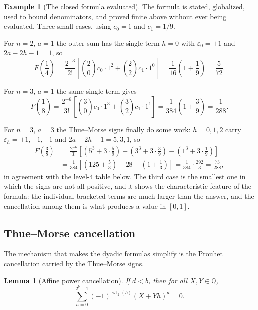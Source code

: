 \documentclass[11pt,oneside]{article}
\newtheorem{lemma}[theorem]{Lemma}
\theoremstyle{definition}
\newtheorem{example}[theorem]{Example}
\theoremstyle{remark}
\newcommand{\Q}{\mathbb Q}
\newcommand{\wt}{\operatorname{wt}_2}
\begin{document}
\begin{example}[The closed formula evaluated]
\label{ex:dy-closed-worked}
The formula is stated, globalized, used to bound denominators, and proved finite above
without ever being evaluated.  Three small cases, using $c_0=1$ and $c_1=1/9$.

For $n=2$, $a=1$ the outer sum has the single term $h=0$ with $\varepsilon_0=+1$ and
$2a-2h-1=1$, so
\begin{equation*}
 F\!\left(\frac14\right)=\frac{2^{-3}}{2!}
 \left[\binom20c_0\cdot1^{2}+\binom22c_1\cdot1^{0}\right]
 =\frac1{16}\left(1+\frac19\right)=\frac5{72}.
\end{equation*}

For $n=3$, $a=1$ the same single term gives
\begin{equation*}
 F\!\left(\frac18\right)=\frac{2^{-6}}{3!}
 \left[\binom30c_0\cdot1^{3}+\binom32c_1\cdot1^{1}\right]
 =\frac1{384}\left(1+\frac39\right)=\frac1{288}.
\end{equation*}

For $n=3$, $a=3$ the Thue--Morse signs finally do some work: $h=0,1,2$ carry
$\varepsilon_h=+1,-1,-1$ and $2a-2h-1=5,3,1$, so
\begin{align*}
 F\!\left(\frac38\right)
 &=\frac{2^{-6}}{3!}\left[\left(5^{3}+3\cdot\frac{5}{9}\right)
   -\left(3^{3}+3\cdot\frac{3}{9}\right)
   -\left(1^{3}+3\cdot\frac{1}{9}\right)\right]\\
 &=\frac1{384}\left[\left(125+\frac53\right)-28-\left(1+\frac13\right)\right]
 =\frac1{384}\cdot\frac{292}{3}=\frac{73}{288},
\end{align*}
in agreement with the level-$4$ table below.  The third case is the smallest one in which the
signs are not all positive, and it shows the characteristic feature of the formula: the
individual bracketed terms are much larger than the answer, and the cancellation among them
is what produces a value in $[0,1]$.
\end{example}

\subsection{Thue--Morse cancellation}

The mechanism that makes the dyadic formulas simplify is the Prouhet cancellation carried by
the Thue--Morse signs.

\begin{lemma}[Affine power cancellation]
If $d<b$, then for all $X,Y\in\Q$,
\begin{equation}
 \sum_{h=0}^{2^b-1}(-1)^{\wt(h)}(X+Yh)^d=0.               \label{eq:thue-affine-cancel}
\end{equation}
\end{lemma}
\end{document}
